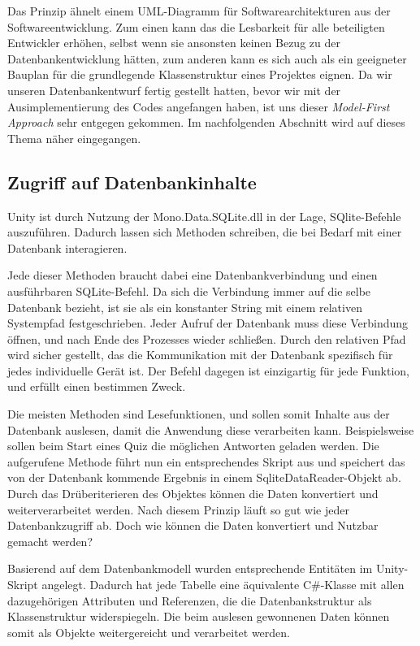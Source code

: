 Das Prinzip ähnelt einem UML-Diagramm für Softwarearchitekturen aus der Softwareentwicklung. Zum einen kann das die Lesbarkeit für alle beteiligten Entwickler erhöhen, selbst wenn sie ansonsten keinen Bezug zu der Datenbankentwicklung hätten, zum anderen kann es sich auch als ein geeigneter Bauplan für die grundlegende Klassenstruktur eines Projektes eignen. Da wir unseren Datenbankentwurf fertig gestellt hatten, bevor wir mit der Ausimplementierung des Codes angefangen haben, ist uns dieser \textit{Model-First Approach} sehr entgegen gekommen. Im nachfolgenden Abschnitt wird auf dieses Thema näher eingegangen.

\subsection{Zugriff auf Datenbankinhalte}\label{zugriff_datenbank}
Unity ist durch Nutzung der Mono.Data.SQLite.dll in der Lage, SQlite-Befehle auszuführen. Dadurch lassen sich Methoden schreiben, die bei Bedarf mit einer Datenbank interagieren.

Jede dieser Methoden braucht dabei eine Datenbankverbindung und einen ausführbaren SQLite-Befehl. Da sich die Verbindung immer auf die selbe Datenbank bezieht, ist sie als ein konstanter String mit einem relativen Systempfad festgeschrieben. Jeder Aufruf der Datenbank muss diese Verbindung öffnen, und nach Ende des Prozesses wieder schließen. Durch den relativen Pfad wird sicher gestellt, das die Kommunikation mit der Datenbank spezifisch für jedes individuelle Gerät ist. Der Befehl dagegen ist einzigartig für jede Funktion, und erfüllt einen bestimmen Zweck.

Die meisten Methoden sind Lesefunktionen, und sollen somit Inhalte aus der Datenbank auslesen, damit die Anwendung diese verarbeiten kann. Beispielsweise sollen beim Start eines Quiz die möglichen Antworten geladen werden. Die aufgerufene Methode führt nun ein entsprechendes Skript aus und speichert das von der Datenbank kommende Ergebnis in einem SqliteDataReader-Objekt ab. Durch das Drüberiterieren des Objektes können die Daten konvertiert und weiterverarbeitet werden. Nach diesem Prinzip läuft so gut wie jeder Datenbankzugriff ab. Doch wie können die Daten konvertiert und Nutzbar gemacht werden?

Basierend auf dem Datenbankmodell wurden entsprechende Entitäten im Unity-Skript angelegt. Dadurch hat jede Tabelle eine äquivalente C\#-Klasse mit allen dazugehörigen Attributen und Referenzen, die die Datenbankstruktur als Klassenstruktur widerspiegeln. Die beim auslesen gewonnenen Daten können somit als Objekte weitergereicht und verarbeitet werden. 

